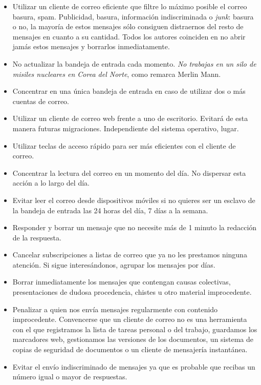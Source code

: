 \documentclass[12pt, a4paper,twoside]{book}
\begin{document}
\begin{itemize}
\item
  Utilizar un cliente de correo eficiente que filtre lo máximo
  posible el correo basura, spam. Publicidad, basura, información
  indiscriminada o \emph{junk}: basura o no, la mayoría de estos
  mensajes sólo consiguen distraernos del resto de mensajes en cuanto
  a su cantidad. Todos los autores coinciden en no abrir jamás estos
  mensajes y borrarlos inmediatamente.
\item
  No actualizar la bandeja de entrada cada momento.
  \emph{No trabajas en un silo de misiles nucleares en Corea del Norte},
  como remarca Merlin Mann.
\item
  Concentrar en una única bandeja de entrada en caso de utilizar dos
  o más cuentas de correo.
\item
  Utilizar un cliente de correo web frente a uno de escritorio.
  Evitará de esta manera futuras migraciones. Independiente del
  sistema operativo, lugar.
\item
  Utilizar teclas de acceso rápido para ser más eficientes con el
  cliente de correo.
\item
  Concentrar la lectura del correo en un momento del día. No
  dispersar esta acción a lo largo del día.
\item
  Evitar leer el correo desde dispositivos móviles si no quieres ser
  un esclavo de la bandeja de entrada las 24 horas del día, 7 días a
  la semana.
\item
  Responder y borrar un mensaje que no necesite más de 1 minuto la
  redacción de la respuesta.
\item
  Cancelar subscripciones a listas de correo que ya no les prestamos
  ninguna atención. Si sigue interesándonos, agrupar los mensajes por
  días.
\item
  Borrar inmediatamente los mensajes que contengan causas colectivas,
  presentaciones de dudosa procedencia, chistes u otro material
  improcedente.
\item
  Penalizar a quien nos envía mensajes regularmente con contenido
  improcedente. Convencerse que un cliente de correo no es una
  herramienta con el que registramos la lista de tareas personal o
  del trabajo, guardamos los marcadores web, gestionamos las
  versiones de los documentos, un sistema de copias de seguridad de
  documentos o un cliente de mensajería instantánea.
\item
  Evitar el envío indiscriminado de mensajes ya que es probable que
  recibas un número igual o mayor de respuestas.

\end{itemize}
\end{document}
